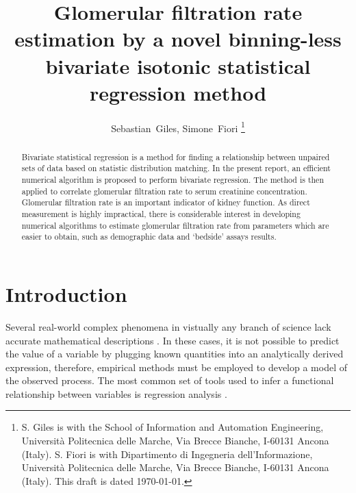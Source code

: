 \documentclass[10pt,final]{siamltex}
\begin{document}
\title{Glomerular filtration rate estimation by a novel binning-less bivariate isotonic statistical regression method}
\author{Sebastian~Giles, Simone~Fiori%
\thanks{S. Giles is with the School of Information and Automation Engineering,
Universit\`{a} Politecnica delle Marche,
Via Brecce Bianche, I-60131 Ancona (Italy).
\newline\indent
S. Fiori is with Dipartimento di Ingegneria dell'Informazione,
Universit\`{a} Politecnica delle Marche,
Via Brecce Bianche, I-60131 Ancona (Italy).
\newline\indent
This draft is dated \today.}}
\maketitle
\def\bbbr{\mathbb{R}}
\def\bbbx{\mathbb{X}}
\def\bbby{\mathbb{Y}}
\def\mdef{{\stackrel{{\mathrm{def}}}{=}}}
\renewcommand*{\thefootnote}{\fnsymbol{footnote}}
\def\to{\mathbf{\ to\ }}
\setcounter{footnote}{1}
%
%
\begin{abstract}
  Bivariate statistical regression is a method for finding a relationship between unpaired sets of data based on statistic distribution matching. In the present report, an efficient numerical algorithm is proposed to perform bivariate regression. The method is then applied to correlate glomerular filtration rate to serum creatinine concentration. Glomerular filtration rate is an important indicator of kidney function. As direct measurement is highly impractical, there is considerable interest in developing numerical algorithms to estimate glomerular filtration rate from parameters which are easier to obtain, such as demographic data and `bedside' assays results.
\end{abstract}
%
\section{Introduction}\label{intro}
Several real-world complex phenomena in vistually any branch of science lack accurate mathematical descriptions \cite{seismic,strontium}. In these cases, it is not possible to predict the value of a variable by plugging known quantities into an analytically derived expression, therefore, empirical methods must be employed to develop a model of the observed process. The most common set of tools used to infer a functional relationship between variables is regression analysis \cite{control, ts}.

\end{document}
